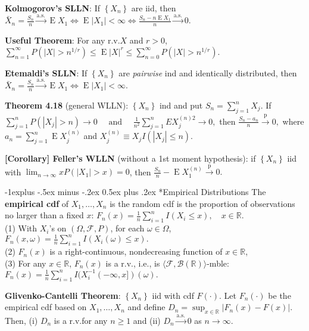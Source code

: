 \documentclass[paper=letter,fontsize=2.89mm]{scrartcl}
\makeatletter
\DeclareMathOperator{\E}{E}
\newcommand{\convprob}{\stackrel{\text{p}}{\longrightarrow}}
\newcommand{\convas}{\stackrel{\text{a.s.}}{\longrightarrow}}
\newcommand{\Borel}{\mathcal{B}}
\newcommand{\R}{\mathbb{R}}
\newcommand\abs[1]{\left| #1 \right|}
\newcommand\set[1]{\left\{ #1 \right\}}
\renewcommand{\subsection}{\@startsection{subsection}{2}{0mm}%
                                {-1explus -.5ex minus -.2ex}%
                                {0.5ex plus .2ex}%
                                {\normalfont\normalsize\bfseries}}
\makeatother
\begin{document}
\begin{multicols*}{3}
\textbf{Kolmogorov's SLLN}: If $\set{X_n}$ are iid, then 
$\bar{X}_n = \frac{S_n}{n} \convas \E X_1 \iff \E\abs{X_1} < \infty \iff \frac{S_n - n\E X_1}{n} \convas 0.$ \\ \medskip

\textbf{Useful Theorem}: For any r.v.\@  $X$ and $r > 0$, $\sum_{n=1}^\infty P(\abs{X} > n^{1/r}) \le \E\abs{X}^r \le \sum_{n=0}^\infty P(\abs{X} > n^{1/r}).$ \\ \medskip

\textbf{Etemaldi's SLLN}: If $\set{X_n}$ are \emph{pairwise} ind and identically distributed, then 
$\bar{X}_n = \frac{S_n}{n} \convas \E X_1 \iff \E\abs{X_1} < \infty.$ \\ \medskip

\textbf{Theorem 4.18} (general WLLN): $\set{X_n}$ ind and put $S_n = \sum_{j=1}^n X_j$. If
$ \sum_{j=1}^n P(\abs{X_j} > n) \to 0 \quad \text{ and } \quad \frac{1}{n^2} \sum_{j=1}^n E X_j^{(n)2} \to 0,$
then $\frac{S_n-a_n}{n}\convprob 0,$
where $a_n = \sum_{j=1}^n \E X_j^{(n)}$ and $X_j^{(n)} \equiv X_j I(\abs{X_j} \le n).$ \\ \medskip

\textbf{[Corollary] Feller's WLLN} (without a 1st moment hypothesis): if $\set{X_n}$ iid with $\lim_{n\to\infty} xP(\abs{X_1}>x) = 0$, then $\frac{S_n}{n} - \E X_1^{(n)} \convprob 0.$ \\ \medskip


\subsection*{Empirical Distributions}
The \textbf{empirical cdf} of $X_1, \dots, X_n$ is the random cdf is the proportion of observations no larger than a fixed $x$:
$F_n(x) = \frac{1}{n} \sum_{i=1}^n I(X_i \le x), \quad x \in \R.$ \\
(1) With $X_i$'s on $(\Omega, \mathcal{F}, P)$, for each $\omega \in \Omega$,
$F_n(x, \omega) = \frac{1}{n} \sum_{i=1}^n I(X_i(\omega) \le x).$ \\
(2) $F_n(x)$ is a right-continuous, nondecreasing function of $x \in \R$, \\
(3) For any $x \in \R$, $F_n(x)$ is a r.v., i.e., is $\langle \mathcal{F}, \Borel(\R)\rangle$-mble:
$F_n(x) = \frac{1}{n}\sum_{i=1}^n I(X_i^{-1}(-\infty,x])(\omega).$ \\ \medskip

\textbf{Glivenko-Cantelli Theorem}: $\set{X_n}$ iid with cdf $F(\cdot)$. Let $F_n(\cdot)$ be the empirical cdf based on $X_1, \dots, X_n$ and define 
$D_n = \sup_{x\in\R} \abs{F_n(x) - F(x)}.$ 
Then, (i) $D_n$ is a r.v.\@ for any $n \ge 1$ and (ii) $D_n \convas 0$ as $n \to \infty$. \\ \medskip


\end{multicols*}
\end{document}
